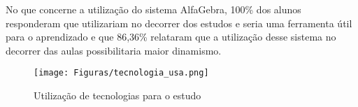 No que concerne a utilização do sistema AlfaGebra, 100\% dos alunos responderam que utilizariam no decorrer dos estudos e seria uma ferramenta útil para o aprendizado e que 86,36\% relataram que a utilização desse sistema no decorrer das aulas possibilitaria maior dinamismo.

\begin{figure}[!htb]
  \centering 
  \texttt{[image: Figuras/tecnologia\_usa.png]}
  \caption{Utilização de tecnologias para o estudo}
  \label{tecnologia_estudo}
\end{figure}

